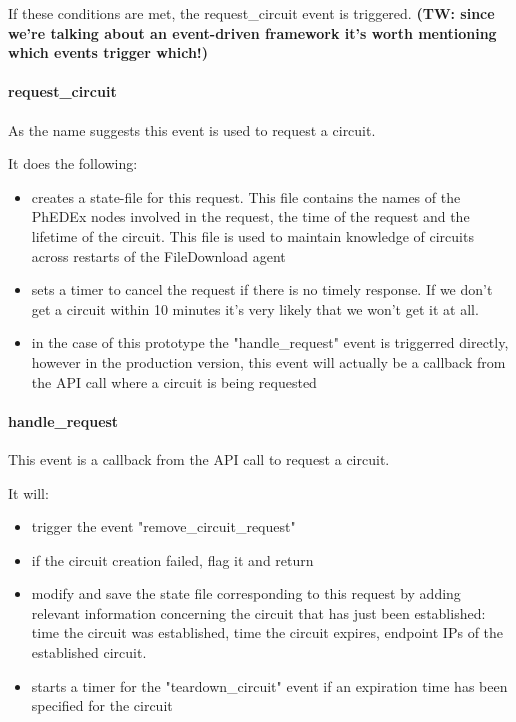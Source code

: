 If these conditions are met, the request\_circuit event is triggered. \textbf{(TW: since we're talking about an event-driven framework it's worth mentioning which events trigger which!)}

\paragraph{request\_circuit}

As the name suggests this event is used to request a circuit.

It does the following:
\begin{itemize}
  \item creates a state-file for this request. This file contains the names of the PhEDEx nodes involved in the request, the time of the request and the 
lifetime of the circuit. This file is used to maintain knowledge of circuits across restarts of the FileDownload agent
  \item sets a timer to cancel the request if there is no timely response. If we don't
get a circuit within 10 minutes it's very likely that we won't get it at all.
  \item in the case of this prototype the "handle\_request" event is triggerred directly,
however in the production version, this event will actually be a callback
from the API call where a circuit is being requested
\end{itemize}

\paragraph{handle\_request}

This event is a callback from the API call to request a circuit.

It will:
\begin{itemize}
  \item trigger the event "remove\_circuit\_request"
  \item if the circuit creation failed, flag it and return
  \item modify and save the state file corresponding to this request by
adding relevant information concerning the circuit that has just been established:
time the circuit was established, time the circuit expires, endpoint IPs of 
the established circuit.
  \item starts a timer for the "teardown\_circuit" event if an expiration
time has been specified for the circuit
\end{itemize}

